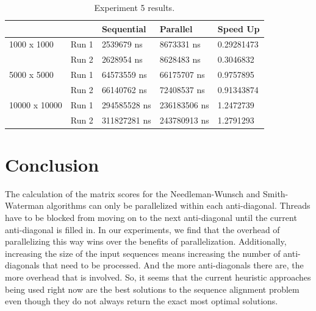 \documentclass[conference]{IEEEtran}
\begin{document}
\begin{table}[]
\caption{Experiment 5 results.}
\label{tab:table5}
\begin{tabular}{|l|l|l|l|l|}
\hline
              &       & Sequential   & Parallel     & Speed Up   \\ \hline
1000 x 1000   & Run 1 & 2539679 ns   & 8673331 ns   & 0.29281473 \\ \hline
              & Run 2 & 2628954 ns   & 8628483 ns   & 0.3046832  \\ \hline
5000 x 5000   & Run 1 & 64573559 ns  & 66175707 ns  & 0.9757895  \\ \hline
              & Run 2 & 66140762 ns  & 72408537 ns  & 0.91343874 \\ \hline
10000 x 10000 & Run 1 & 294585528 ns & 236183506 ns & 1.2472739  \\ \hline
              & Run 2 & 311827281 ns & 243780913 ns & 1.2791293  \\ \hline
\end{tabular}
\end{table}

\section{Conclusion}
The calculation of the matrix scores for the Needleman-Wunsch and Smith-Waterman algorithms can only be parallelized within each anti-diagonal. Threads have to be blocked from moving on to the next anti-diagonal until the current anti-diagonal is filled in. In our experiments, we find that the overhead of parallelizing this way wins over the benefits of parallelization. Additionally, increasing the size of the input sequences means increasing the number of anti-diagonals that need to be processed. And the more anti-diagonals there are, the more overhead that is involved. So, it seems that the current heuristic approaches being used right now are the best solutions to the sequence alignment problem even though they do not always return the exact most optimal solutions.



\end{document}
